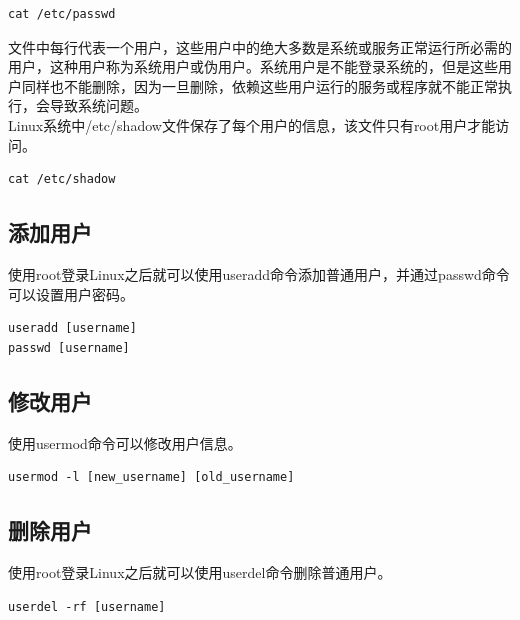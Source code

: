 \documentclass[12pt, openany, oneside]{book}
\begin{document}
\vspace{-0.5cm}
\begin{lstlisting}
cat /etc/passwd
\end{lstlisting}

文件中每行代表一个用户，这些用户中的绝大多数是系统或服务正常运行所必需的用户，这种用户称为系统用户或伪用户。系统用户是不能登录系统的，但是这些用户同样也不能删除，因为一旦删除，依赖这些用户运行的服务或程序就不能正常执行，会导致系统问题。 \\

Linux系统中/etc/shadow文件保存了每个用户的信息，该文件只有root用户才能访问。

\vspace{-0.5cm}
\begin{lstlisting}
cat /etc/shadow
\end{lstlisting}

\subsection{添加用户}

使用root登录Linux之后就可以使用useradd命令添加普通用户，并通过passwd命令可以设置用户密码。

\vspace{-0.5cm}
\begin{lstlisting}
useradd [username]
passwd [username]
\end{lstlisting}

\subsection{修改用户}

使用usermod命令可以修改用户信息。

\vspace{-0.5cm}
\begin{lstlisting}
usermod -l [new_username] [old_username]
\end{lstlisting}

\subsection{删除用户}

使用root登录Linux之后就可以使用userdel命令删除普通用户。

\vspace{-0.5cm}
\begin{lstlisting}
userdel -rf [username]
\end{lstlisting}
\end{document}
